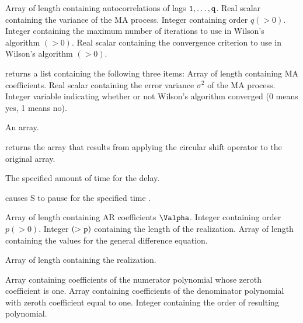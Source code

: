 
\Sarg
{} Array of length {} containing autocorrelations of 
lags ${\tt{1}},\ldots,{\tt{q}}$.
 Real scalar containing the variance of the MA process.
 Integer containing order $q(>0)$.
 Integer containing the maximum number of iterations to use
in Wilson's algorithm $(>0)$.
 Real scalar containing the convergence criterion to use in
Wilson's algorithm $(>0)$.

\Sval
\Sitem{ }  returns a list containing the following 
three items:
 Array of length {} containing MA coefficients.
 Real scalar containing the error variance $\sigma^2$ 
of the MA process.
 Integer variable indicating whether or not Wilson's 
algorithm converged (0 means yes, 1 means no).
%
%


\Sarg
{} An array.

\Sval
\Sitem{ }  returns the array that results from applying 
the circular shift operator to the original array.
%
%


\Sarg
{} The specified amount of time for the delay.

\Sval
\Sitem{ }  causes S to pause for the specified time {}.
%
%


\Sarg
{} Array of length {} containing AR coefficients $\Valpha$.
 Integer containing order $p(>0)$.
 Integer $(>{\tt{p}})$ containing the length of the realization.
 Array of length {} containing the values for the
general difference equation.

\Sval
{} Array of length {} containing the realization.
%
%


\Sarg
{} Array containing coefficients of the numerator polynomial whose 
zeroth coefficient is one.
 Array containing coefficients of the denominator polynomial
with zeroth coefficient equal to one.
 Integer containing the order of resulting polynomial. 


